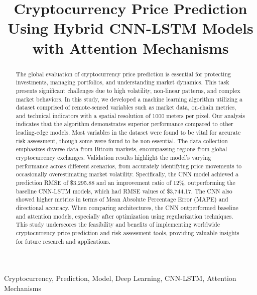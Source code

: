 \documentclass[conference]{IEEEtran}
\begin{document}
\title{Cryptocurrency Price Prediction Using Hybrid CNN-LSTM Models with Attention Mechanisms}

\author{
}

\maketitle

\begin{abstract}
The global evaluation of cryptocurrency price prediction is essential for protecting investments, managing portfolios, and understanding market dynamics. This task presents significant challenges due to high volatility, non-linear patterns, and complex market behaviors. In this study, we developed a machine learning algorithm utilizing a dataset comprised of remote-sensed variables such as market data, on-chain metrics, and technical indicators with a spatial resolution of 1000 meters per pixel. Our analysis indicates that the algorithm demonstrates superior performance compared to other leading-edge models. Most variables in the dataset were found to be vital for accurate risk assessment, though some were found to be non-essential. The data collection emphasizes diverse data from Bitcoin markets, encompassing regions from global cryptocurrency exchanges. Validation results highlight the model's varying performance across different scenarios, from accurately identifying price movements to occasionally overestimating market volatility. Specifically, the CNN model achieved a prediction RMSE of \$3,295.88 and an improvement ratio of 12\%, outperforming the baseline CNN-LSTM models, which had RMSE values of \$3,744.17. The CNN also showed higher metrics in terms of Mean Absolute Percentage Error (MAPE) and directional accuracy. When comparing architectures, the CNN outperformed baseline and attention models, especially after optimization using regularization techniques. This study underscores the feasibility and benefits of implementing worldwide cryptocurrency price prediction and risk assessment tools, providing valuable insights for future research and applications.
\end{abstract}

\begin{IEEEkeywords}
Cryptocurrency, Prediction, Model, Deep Learning, CNN-LSTM, Attention Mechanisms
\end{IEEEkeywords}
\end{document}

